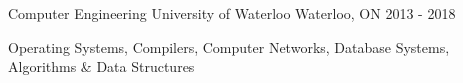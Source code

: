 

\begin{cventries}

  \cventry
    {Computer Engineering} %
    {University of Waterloo} %
    {Waterloo, ON} %
    {2013 - 2018} %
    {
      \begin{cvitems} %
      \item {Operating Systems, Compilers, Computer Networks, Database Systems, Algorithms \& Data Structures}
      \end{cvitems}
    }

\end{cventries}

